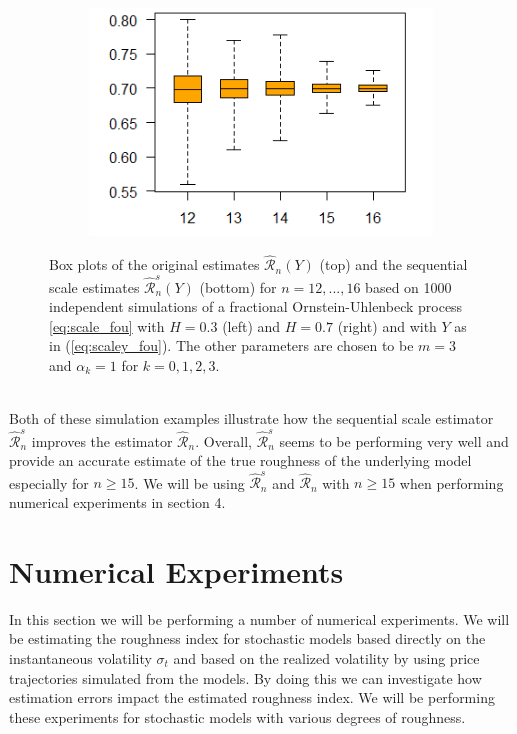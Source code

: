 \documentclass{article}
\begin{document}
\begin{figure}[htbp]
\begin{subfigure}{0.48\textwidth}
    \end{subfigure}
    \hfill
    \begin{subfigure}{0.48\textwidth}
        \includegraphics[width=\linewidth]{07fou_scale.png}
    \end{subfigure}
    
    \caption{Box plots of the original estimates $\hat{\mathscr{R}}_n (Y)$ (top) and the sequential scale estimates $\hat{\mathscr{R}}_n^s (Y)$ (bottom) for $n=12,...,16$ based on 1000 independent simulations of a fractional Ornstein-Uhlenbeck process \eqref{eq:scale_fou} with $H=0.3$ (left) and $H=0.7$ (right) and with $Y$ as in (\ref{eq:scaley_fou}). The other parameters are chosen to be $m=3$ and $\alpha_k = 1$ for $k=0,1,2,3$.} \label{fig:scaleplot_fou}
\end{figure}\\
Both of these simulation examples illustrate how the sequential scale estimator $\widehat{\mathscr{R}}_n^s$ improves the estimator $\widehat{\mathscr{R}}_n$. Overall, $\widehat{\mathscr{R}}_n^s$ seems to be performing very well and provide an accurate estimate of the true roughness of the underlying model especially for $n\geq 15$. We will be using $\widehat{\mathscr{R}}_n^s$ and $\widehat{\mathscr{R}}_n$ with $n\geq 15$ when performing numerical experiments in section 4.
\section{Numerical Experiments} \label{sec:num_exp}
In this section we will be performing a number of numerical experiments. We will be estimating the roughness index for stochastic models based directly on the instantaneous volatility $\sigma_t$ and based on the realized volatility by using price trajectories simulated from the models. By doing this we can investigate how estimation errors impact the estimated roughness index. We will be performing these experiments for stochastic models with various degrees of roughness.
\end{document}
